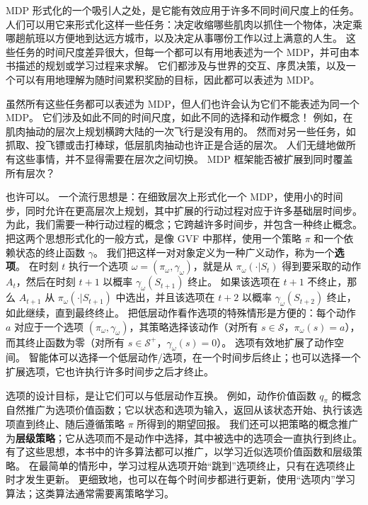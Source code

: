 \documentclass[UTF8, 12pt, fontset=fandol, oneside]{ctexart}
\begin{document}
MDP 形式化的一个吸引人之处，是它能有效应用于许多不同时间尺度上的任务。
人们可以用它来形式化这样一些任务：决定收缩哪些肌肉以抓住一个物体，决定乘哪趟航班以方便地到达远方城市，以及决定从事哪份工作以过上满意的人生。
这些任务的时间尺度差异很大，但每一个都可以有用地表述为一个 MDP，并可由本书描述的规划或学习过程来求解。
它们都涉及与世界的交互、序贯决策，以及一个可以有用地理解为随时间累积奖励的目标，因此都可以表述为 MDP。

虽然所有这些任务都可以表述为 MDP，但人们也许会认为它们不能表述为同一个 MDP。
它们涉及如此不同的时间尺度，如此不同的选择和动作概念！
例如，在肌肉抽动的层次上规划横跨大陆的一次飞行是没有用的。
然而对另一些任务，如抓取、投飞镖或击打棒球，低层肌肉抽动也许正是合适的层次。
人们无缝地做所有这些事情，并不显得需要在层次之间切换。
MDP 框架能否被扩展到同时覆盖所有层次？

也许可以。
一个流行思想是：在细致层次上形式化一个 MDP，使用小的时间步，同时允许在更高层次上规划，其中扩展的行动过程对应于许多基础层时间步。
为此，我们需要一种行动过程的概念；它跨越许多时间步，并包含一种终止概念。
把这两个思想形式化的一般方式，是像 GVF 中那样，使用一个策略 $\pi$ 和一个依赖状态的终止函数 $\gamma$。
我们把这样一对对象定义为一种广义动作，称为一个\textbf{选项}。
在时刻 $t$ 执行一个选项 $\omega=(\pi_\omega,\gamma_\omega)$，就是从 $\pi_\omega(\cdot|S_t)$ 得到要采取的动作 $A_t$，然后在时刻 $t+1$ 以概率 $\gamma_\omega(S_{t+1})$ 终止。
如果该选项在 $t+1$ 不终止，那么 $A_{t+1}$ 从 $\pi_\omega(\cdot|S_{t+1})$ 中选出，并且该选项在 $t+2$ 以概率 $\gamma_\omega(S_{t+2})$ 终止，如此继续，直到最终终止。
把低层动作看作选项的特殊情形是方便的：每个动作 $a$ 对应于一个选项 $(\pi_\omega,\gamma_\omega)$，其策略选择该动作（对所有 $s\in\mathcal{S}$，$\pi_\omega(s)=a$），而其终止函数为零（对所有 $s\in\mathcal{S}^+$，$\gamma_\omega(s)=0$）。
选项有效地扩展了动作空间。
智能体可以选择一个低层动作/选项，在一个时间步后终止；也可以选择一个扩展选项，它也许执行许多时间步之后才终止。

选项的设计目标，是让它们可以与低层动作互换。
例如，动作价值函数 $q_\pi$ 的概念自然推广为选项价值函数；它以状态和选项为输入，返回从该状态开始、执行该选项直到终止、随后遵循策略 $\pi$ 所得到的期望回报。
我们还可以把策略的概念推广为\textbf{层级策略}；它从选项而不是动作中选择，其中被选中的选项会一直执行到终止。
有了这些思想，本书中的许多算法都可以推广，以学习近似选项价值函数和层级策略。
在最简单的情形中，学习过程从选项开始“跳到”选项终止，只有在选项终止时才发生更新。
更细致地，也可以在每个时间步都进行更新，使用“选项内”学习算法；这类算法通常需要离策略学习。
\end{document}
